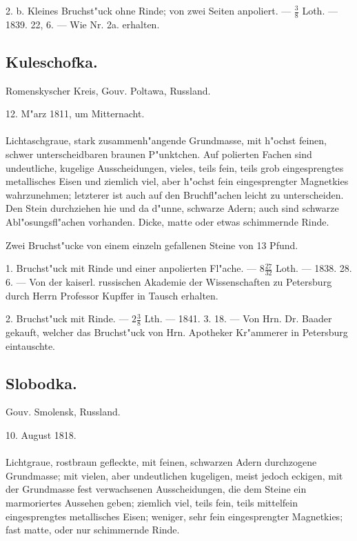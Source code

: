 \documentclass[a4paper, 11pt, oneside, polutonikogreek, german]{article}
\begin{document}
2. b. Kleines Bruchst"uck ohne Rinde; von zwei Seiten anpoliert. --- $\frac{3}{8}$ Loth. --- 1839. 22, 6. --- Wie Nr. 2a. erhalten.
\subsection{Kuleschofka.}
\begin{center}
\small
Romenskyscher Kreis, Gouv. Poltawa, Russland.

12. M"arz 1811, um Mitternacht.
\end{center}
\paragraph{}
Lichtaschgraue, stark zusammenh"angende Grundmasse, mit h"ochst feinen, schwer unterscheidbaren braunen P"unktchen. Auf polierten Fachen sind undeutliche, kugelige Ausscheidungen, vieles, teils fein, teils grob eingesprengtes metallisches Eisen und ziemlich viel, aber h"ochst fein eingesprengter Magnetkies wahrzunehmen; letzterer ist auch auf den Bruchfl"achen leicht zu unterscheiden. Den Stein durchziehen hie und da d"unne, schwarze Adern; auch sind schwarze Abl"osungsfl"achen vorhanden. Dicke, matte oder etwas schimmernde Rinde.

Zwei Bruchst"ucke von einem einzeln gefallenen Steine von 13 Pfund.

1. Bruchst"uck mit Rinde und einer anpolierten Fl"ache. --- $8\frac{27}{32}$ Loth. --- 1838. 28. 6. --- Von der kaiserl. russischen Akademie der Wissenschaften zu Petersburg durch Herrn Professor Kupffer in Tausch erhalten.

2. Bruchst"uck mit Rinde. --- $2\frac{3}{8}$ Lth. --- 1841. 3. 18. --- Von Hrn. Dr. Baader gekauft, welcher das Bruchst"uck von Hrn. Apotheker Kr"ammerer in Petersburg eintauschte.
\subsection{Slobodka.}
\begin{center}
\small
Gouv. Smolensk, Russland.

10. August 1818.
\end{center}
\paragraph{}
Lichtgraue, rostbraun gefleckte, mit feinen, schwarzen Adern durchzogene Grundmasse; mit vielen, aber undeutlichen kugeligen, meist jedoch eckigen, mit der Grundmasse fest verwachsenen Ausscheidungen, die dem Steine ein marmoriertes Aussehen geben; ziemlich viel, teils fein, teils mittelfein eingesprengtes metallisches Eisen; weniger, sehr fein eingesprengter Magnetkies; fast matte, oder nur schimmernde Rinde.
\end{document}
